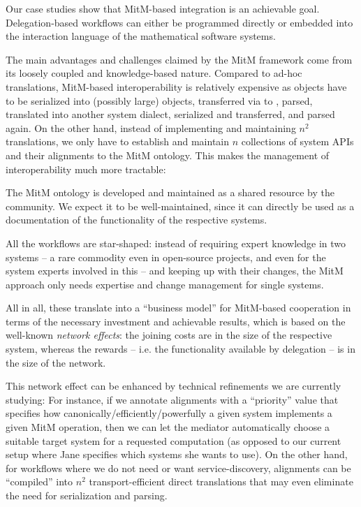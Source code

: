 Our case studies show that MitM-based integration is an achievable goal.
Delegation-based workflows can either be programmed directly or embedded into the interaction language of the mathematical software systems.

The main advantages and challenges claimed by the MitM framework come from its loosely coupled and knowledge-based nature.
Compared to ad-hoc translations, MitM-based interoperability is relatively expensive as objects have to be serialized into (possibly large) \OMMT objects, transferred via \SCSCP to \MMT, parsed, translated into another system dialect, serialized and transferred, and parsed again.
On the other hand, instead of implementing and maintaining $n^2$ translations, we only have to establish and maintain $n$ collections of system APIs and their alignments to the
MitM ontology.
This makes the management of interoperability much more tractable:
\begin{compactenum}
\item The MitM ontology is developed and maintained as a shared resource by the community.
We expect it to be well-maintained, since it can directly be used as a documentation of the functionality of the respective systems.
\item All the workflows are star-shaped: instead of requiring expert knowledge in two systems -- a rare commodity even in open-source projects, and even for the system experts involved in this \papertype -- and keeping up with their changes, the MitM approach only needs expertise and change management for single systems.
\end{compactenum}
All in all, these translate into a ``business model'' for MitM-based cooperation in terms of the necessary investment and achievable results, which is based on the well-known \emph{network effects}: the joining costs are in the size of the respective system, whereas the rewards -- i.e. the functionality available by delegation -- is in the size of the network.

This network effect can be enhanced by technical refinements we are currently studying:
For instance, if we annotate alignments with a ``priority'' value that specifies how canonically/efficiently/powerfully a given system implements a given MitM operation, then we can let
the \MMT mediator automatically choose a suitable target system for a requested computation (as opposed to our current setup where Jane specifies which systems she wants to use). On the other hand, for workflows where we do not need or want service-discovery, alignments can be ``compiled'' into $n^2$ transport-efficient direct translations that may even eliminate the need for serialization and parsing.

